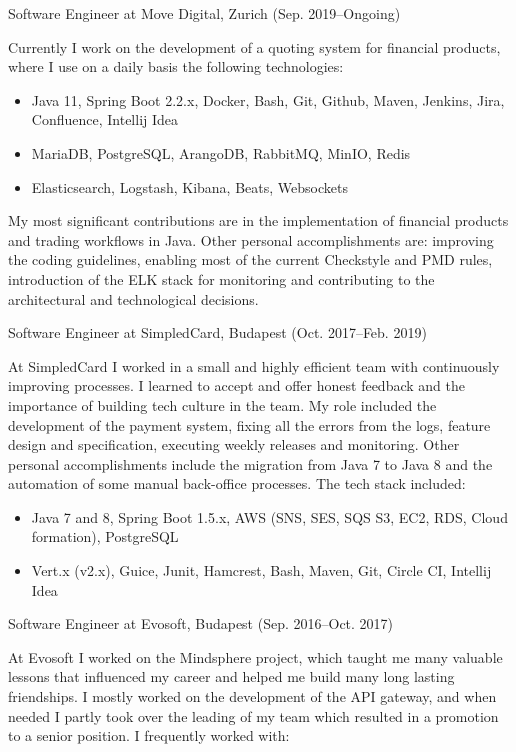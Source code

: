 \documentclass[hidelinks,11pt]{friggeri-cv}
\newenvironment{experience}{\begin{adjustwidth}{-4.6cm}{}}{\end{adjustwidth}}
\begin{document}
\begin{experience}

{\LARGE Software Engineer at Move Digital, Zurich (Sep. 2019--Ongoing)}

Currently I work on the development of a quoting system for financial products, where I use on a daily basis the following technologies:

\begin{itemize}
  \item Java 11, Spring Boot 2.2.x, Docker, Bash, Git, Github, Maven, Jenkins, Jira, Confluence, Intellij Idea
  \item MariaDB, PostgreSQL, ArangoDB, RabbitMQ, MinIO, Redis
  \item Elasticsearch, Logstash, Kibana, Beats, Websockets
\end{itemize}

My most significant contributions are in the implementation of financial products and trading workflows in Java.
Other personal accomplishments are: improving the coding guidelines, enabling most of the current Checkstyle and PMD rules,
introduction of the ELK stack for monitoring and contributing to the architectural and technological decisions.

{\LARGE Software Engineer at SimpledCard, Budapest (Oct. 2017--Feb. 2019)}

At SimpledCard I worked in a small and highly efficient team with continuously improving processes.
I learned to accept and offer honest feedback and the importance of building tech culture in the team.
My role included the development of the payment system, fixing all the errors from the logs, feature design and specification, executing weekly releases and monitoring.
Other personal accomplishments include the migration from Java 7 to Java 8 and the automation of some manual back-office processes. The tech stack included:

\begin{itemize}
  \item Java 7 and 8, Spring Boot 1.5.x, AWS (SNS, SES, SQS S3, EC2, RDS, Cloud formation), PostgreSQL
  \item Vert.x (v2.x), Guice, Junit, Hamcrest, Bash, Maven, Git, Circle CI, Intellij Idea
\end{itemize}

{\LARGE Software Engineer at Evosoft, Budapest (Sep. 2016--Oct. 2017)}

At Evosoft I worked on the Mindsphere project, which taught me many valuable lessons that influenced my career and helped me build many long lasting friendships.
I mostly worked on the development of the API gateway, and when needed I partly took over the leading of my team which resulted in a promotion to a senior position.
I frequently worked with:


\end{experience}
\end{document}
